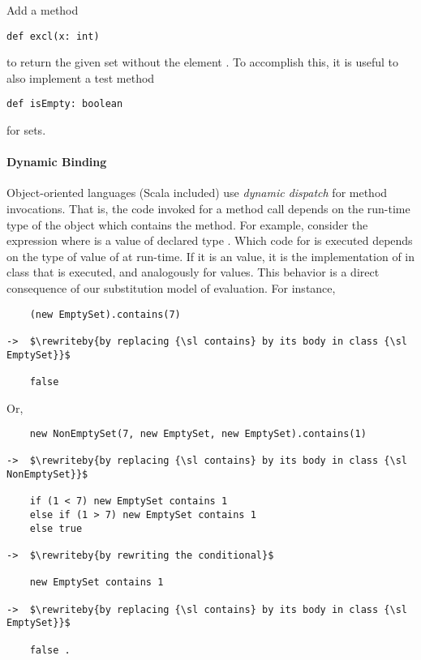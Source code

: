 \begin{exercise} Add a method 
\begin{lstlisting}
def excl(x: int)
\end{lstlisting}
to return the given set without the element . To accomplish this,
it is useful to also implement a test method
\begin{lstlisting}
def isEmpty: boolean
\end{lstlisting}
for sets.
\end{exercise}

\paragraph{Dynamic Binding}

Object-oriented languages (Scala included) use \emph{dynamic dispatch}
for method invocations.  That is, the code invoked for a method call
depends on the run-time type of the object which contains the method.
For example, consider the expression  where
 is a value of declared type . Which code for
 is executed depends on the type of value of  at run-time.
If it is an  value, it is the implementation of  in class  that is executed, and analogously for  values. 
This behavior is a direct consequence of our substitution model of evaluation.
For instance,
\begin{lstlisting}
    (new EmptySet).contains(7) 

->  $\rewriteby{by replacing {\sl contains} by its body in class {\sl EmptySet}}$

    false
\end{lstlisting}
Or,
\begin{lstlisting}
    new NonEmptySet(7, new EmptySet, new EmptySet).contains(1)

->  $\rewriteby{by replacing {\sl contains} by its body in class {\sl NonEmptySet}}$

    if (1 < 7) new EmptySet contains 1
    else if (1 > 7) new EmptySet contains 1
    else true

->  $\rewriteby{by rewriting the conditional}$

    new EmptySet contains 1

->  $\rewriteby{by replacing {\sl contains} by its body in class {\sl EmptySet}}$

    false .
\end{lstlisting}

